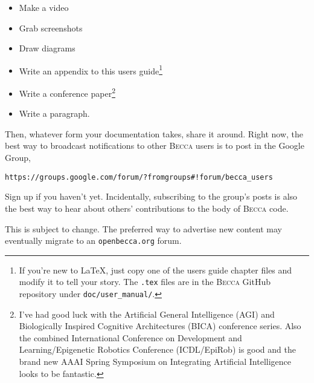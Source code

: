 \begin{itemize}
\item Make a video
\item Grab screenshots
\item Draw diagrams
\item Write an appendix to this users guide\footnote{If you're new to LaTeX, just copy one of the users guide chapter files and modify it to tell your story. The \texttt{.tex} files are in the \textsc{Becca} GitHub repository under \texttt{doc/user\_manual/}.}
\item Write a conference paper\footnote{I've had good luck with the Artificial General Intelligence (AGI) and Biologically Inspired Cognitive Architectures (BICA) conference series. Also the combined International Conference on Development and Learning/Epigenetic Robotics Conference (ICDL/EpiRob) is good and the brand new AAAI Spring Symposium on Integrating Artificial Intelligence looks to be fantastic.}
\item Write a paragraph.
\end{itemize}

Then, whatever form your documentation takes, share it around. Right now, the best way to broadcast notifications to other \textsc{Becca} users is to post in the Google Group, 

\begin{verbatim}
https://groups.google.com/forum/?fromgroups#!forum/becca_users
\end{verbatim}

Sign up if you haven't yet. Incidentally, subscribing to the group's posts is also the best way to hear about others' contributions to the body of \textsc{Becca} code.

This is subject to change. The preferred way to advertise new content may eventually migrate to an \texttt{openbecca.org} forum.

